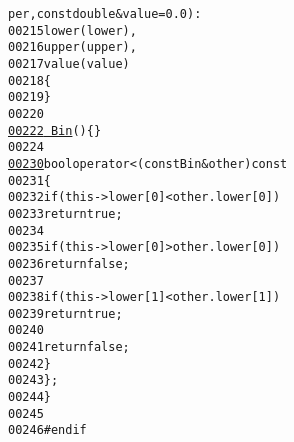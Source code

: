 \begin{footnotesize}
\begin{alltt}
      per, \textcolor{keyword}{const} \textcolor{keywordtype}{double} & value = 0.0) :
00215             lower(lower),
00216             upper(upper),
00217             value(value)
00218         \{
00219         \}
00220 
\hypertarget{histogram_8hh_source_l00222}{}\hyperlink{structeos_1_1Histogram_3_012_01_4_1_1Bin_a945e453f3b5aa775c74122b2a5c8c983}{00222}         \hyperlink{structeos_1_1Histogram_3_012_01_4_1_1Bin_a945e453f3b5aa775c74122b2a5c8c983}{~Bin}() \{ \}
00224 
\hypertarget{histogram_8hh_source_l00230}{}\hyperlink{structeos_1_1Histogram_3_012_01_4_1_1Bin_a5f5d9d357e94ce75149ac710b954bb44}{00230}         \textcolor{keywordtype}{bool} operator< (\textcolor{keyword}{const} Bin & other)\textcolor{keyword}{ const}
00231 \textcolor{keyword}{        }\{
00232             \textcolor{keywordflow}{if} (this->lower[0] < other.lower[0])
00233                 \textcolor{keywordflow}{return} \textcolor{keyword}{true};
00234 
00235             \textcolor{keywordflow}{if} (this->lower[0] > other.lower[0])
00236                 \textcolor{keywordflow}{return} \textcolor{keyword}{false};
00237 
00238             \textcolor{keywordflow}{if} (this->lower[1] < other.lower[1])
00239                 \textcolor{keywordflow}{return} \textcolor{keyword}{true};
00240 
00241             \textcolor{keywordflow}{return} \textcolor{keyword}{false};
00242         \}
00243     \};
00244 \}
00245 
00246 \textcolor{preprocessor}{#endif}
\end{alltt}\end{footnotesize}
